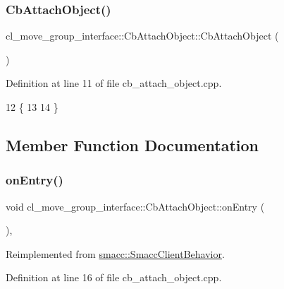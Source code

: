 \subsubsection{\texorpdfstring{Cb\+Attach\+Object()}{CbAttachObject()}\hspace{0.1cm}{\footnotesize\ttfamily [2/2]}}
{\footnotesize\ttfamily cl\+\_\+move\+\_\+group\+\_\+interface\+::\+Cb\+Attach\+Object\+::\+Cb\+Attach\+Object (\begin{DoxyParamCaption}{ }\end{DoxyParamCaption})}



Definition at line 11 of file cb\+\_\+attach\+\_\+object.\+cpp.


\begin{DoxyCode}
12     \{
13         
14     \}
\end{DoxyCode}


\subsection{Member Function Documentation}
\mbox{\label{classcl__move__group__interface_1_1CbAttachObject_a05cd996ea25ee1b2ae74541a5ec56e98}} 
\subsubsection{\texorpdfstring{on\+Entry()}{onEntry()}}
{\footnotesize\ttfamily void cl\+\_\+move\+\_\+group\+\_\+interface\+::\+Cb\+Attach\+Object\+::on\+Entry (\begin{DoxyParamCaption}{ }\end{DoxyParamCaption})\hspace{0.3cm}{\ttfamily [override]}, {\ttfamily [virtual]}}



Reimplemented from \hyperlink{classsmacc_1_1SmaccClientBehavior_ad5d3e1f1697c3cfe66c94cadba948493}{smacc\+::\+Smacc\+Client\+Behavior}.



Definition at line 16 of file cb\+\_\+attach\+\_\+object.\+cpp.




